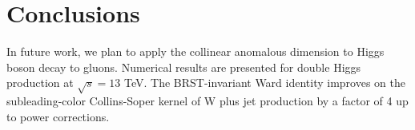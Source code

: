\section{Conclusions}\label{sec:conclusions}

In future work, we plan to apply the collinear anomalous dimension to
Higgs boson decay to gluons. Numerical results are presented for double
Higgs production at $\sqrt{s} = 13$ TeV. The BRST-invariant Ward
identity improves on the subleading-color Collins-Soper kernel of W plus
jet production by a factor of 4 up to power corrections.

